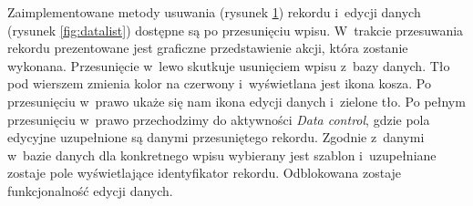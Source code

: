 \documentclass[a4paper,12pt, twoside]{article}
\begin{document}
\begin{enumerate}
\begin{figure}[H]
\begin{minipage}{.5\textwidth}
                    \label{fig:datadelete}
                \end{minipage}%
    	   \end{figure}
    	   Zaimplementowane metody usuwania (rysunek \ref{fig:datadelete}) rekordu i~edycji danych (rysunek \ref{fig:datalist}) dostępne są po przesunięciu wpisu. W~trakcie przesuwania rekordu prezentowane jest graficzne przedstawienie akcji, która zostanie wykonana. Przesunięcie w~lewo skutkuje usunięciem wpisu z~bazy danych. Tło pod wierszem zmienia kolor na czerwony i~wyświetlana jest ikona kosza. 
    	   Po przesunięciu w~prawo ukaże się nam ikona edycji danych i~zielone tło. Po pełnym przesunięciu w~prawo przechodzimy do aktywności \textit{Data control}, gdzie pola edycyjne uzupełnione są danymi przesuniętego rekordu. Zgodnie z~danymi w~bazie danych dla konkretnego wpisu wybierany jest szablon i~uzupełniane zostaje pole wyświetlające identyfikator rekordu. Odblokowana zostaje funkcjonalność edycji danych.
    	   

\end{enumerate}
\end{document}
